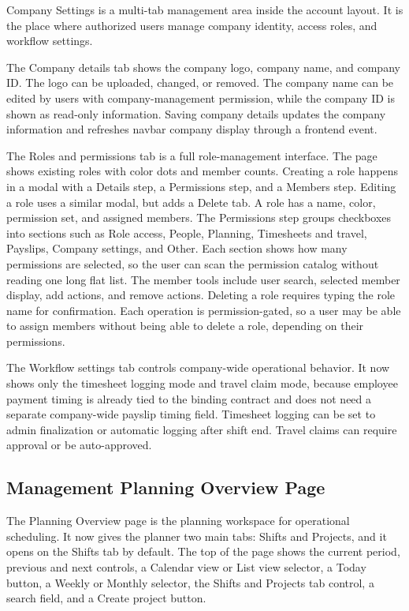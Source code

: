\documentclass[11pt]{article}
\begin{document}
Company Settings is a multi-tab management area inside the account layout. It is the place where authorized users manage company identity, access roles, and workflow settings.

The Company details tab shows the company logo, company name, and company ID. The logo can be uploaded, changed, or removed. The company name can be edited by users with company-management permission, while the company ID is shown as read-only information. Saving company details updates the company information and refreshes navbar company display through a frontend event.

The Roles and permissions tab is a full role-management interface. The page shows existing roles with color dots and member counts. Creating a role happens in a modal with a Details step, a Permissions step, and a Members step. Editing a role uses a similar modal, but adds a Delete tab. A role has a name, color, permission set, and assigned members. The Permissions step groups checkboxes into sections such as Role access, People, Planning, Timesheets and travel, Payslips, Company settings, and Other. Each section shows how many permissions are selected, so the user can scan the permission catalog without reading one long flat list. The member tools include user search, selected member display, add actions, and remove actions. Deleting a role requires typing the role name for confirmation. Each operation is permission-gated, so a user may be able to assign members without being able to delete a role, depending on their permissions.

The Workflow settings tab controls company-wide operational behavior. It now shows only the timesheet logging mode and travel claim mode, because employee payment timing is already tied to the binding contract and does not need a separate company-wide payslip timing field. Timesheet logging can be set to admin finalization or automatic logging after shift end. Travel claims can require approval or be auto-approved.

\subsection{Management Planning Overview Page}

The Planning Overview page is the planning workspace for operational scheduling. It now gives the planner two main tabs: Shifts and Projects, and it opens on the Shifts tab by default. The top of the page shows the current period, previous and next controls, a Calendar view or List view selector, a Today button, a Weekly or Monthly selector, the Shifts and Projects tab control, a search field, and a Create project button.
\end{document}
